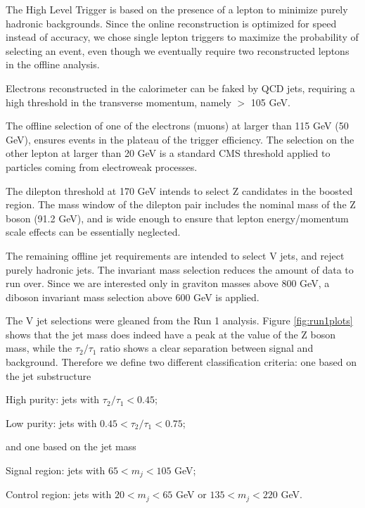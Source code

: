 \begin{compact_itemize}
\item The High Level Trigger is based on the presence of a lepton to minimize purely hadronic backgrounds. Since the online reconstruction is optimized for speed instead of accuracy, we chose single lepton triggers to maximize the probability of selecting an event, even though we eventually require two reconstructed leptons in the offline analysis.
	
\item Electrons reconstructed in the calorimeter can be faked by QCD jets, requiring a high threshold in the transverse momentum, namely \ptrans $>$ 105 GeV.
	

\item The offline selection of one of the electrons (muons) at \ptrans larger than 115 GeV (50 GeV), ensures events in the plateau of the trigger efficiency. The selection on the other lepton at \ptrans larger than 20 GeV is a standard CMS threshold applied to particles coming from electroweak processes.

\item The dilepton \ptrans threshold at 170 GeV intends to select Z candidates in the boosted region. The mass window of the dilepton pair includes the nominal mass of the Z boson (91.2 GeV), and is wide enough to ensure that lepton energy/momentum scale effects can be essentially neglected.

\item The remaining offline jet requirements are intended to select V jets, and reject purely hadronic jets. The invariant mass selection reduces the amount of data to run over. Since we are interested only in graviton masses above 800 GeV, a diboson invariant mass selection above 600 GeV is applied.
\end{compact_itemize}

The V jet selections were gleaned from the Run 1 analysis. Figure \ref{fig:run1plots} shows that the jet mass does indeed have a peak at the value of the Z boson mass, while the $\tau_2/\tau_1$ ratio shows a clear separation between signal and background. Therefore we define two different classification criteria: one based on the jet substructure
\begin{compact_itemize}
\item High purity: jets with $ \tau_2/\tau_1 < 0.45$;
\item Low purity: jets with $ 0.45 < \tau_2/\tau_1 < 0.75$;
\end{compact_itemize}
and one based on the jet mass
\begin{compact_itemize}
\item Signal region: jets with $ 65 < m_j < 105 $ GeV;
\item Control region: jets with $ 20 < m_j < 65 $ GeV or $ 135 < m_j < 220 $ GeV. 
\end{compact_itemize}

